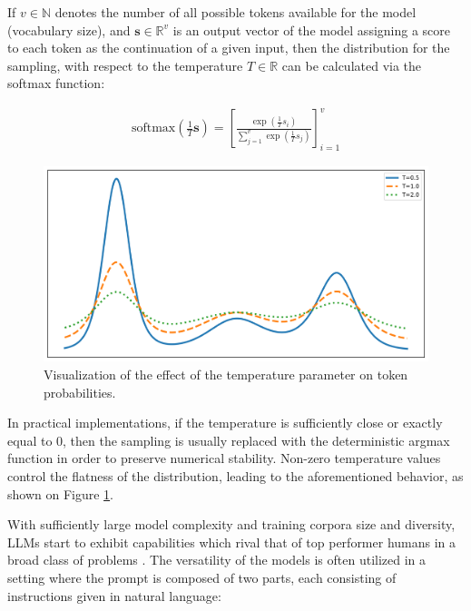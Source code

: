 \documentclass[UTF8,noindent,nohyp,parspace,titlepage,a4paper,12pt]{article}
\begin{document}
      If $v \in \mathbb{N}$ denotes the number of all possible tokens available
      for the model (vocabulary size), and $\mathbf{s} \in \mathbb{R}^v$ is an
      output vector of the model assigning a score to each token as the
      continuation of a given input, then the distribution for the sampling,
      with respect to the temperature $T \in \mathbb{R}$ can be calculated
      via the softmax function:

      \begin{align} \label{eqsoftmax}
        \text{softmax}\left(\frac{1}{T} \mathbf{s}\right)
          = \left[
              \frac{\exp(\frac{1}{T} s_i)}{\sum_{j=1}^v \exp(\frac{1}{T} s_j)}
            \right]_{i=1}^v
      \end{align}

      \begin{figure}[hbtp]
        \includegraphics[width=\textwidth]{softmax-temperature}
        \caption{%
          Visualization of the effect of the temperature parameter on token
          probabilities.
        }
        \label{figtemperature}
      \end{figure}

      In practical implementations, if the temperature is sufficiently close or
      exactly equal to $0$, then the sampling is usually replaced with the
      deterministic argmax function in order to preserve numerical stability.
      Non-zero temperature values control the flatness of the distribution,
      leading to the aforementioned behavior, as shown on Figure
      \ref{figtemperature}.

      With sufficiently large model complexity and training corpora size and
      diversity, LLMs start to exhibit capabilities which rival that of top
      performer humans in a broad class of problems \cite{gpt3,gpt4}. The
      versatility of the models is often utilized in a setting where the prompt
      is composed of two parts, each consisting of instructions given in
      natural language:
\end{document}
